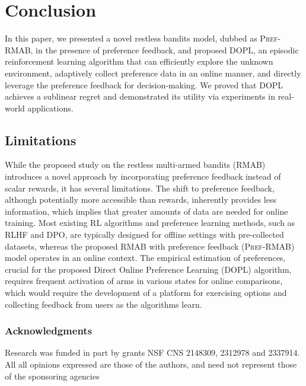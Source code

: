 \documentclass{article} %
\newcommand{\RMABPF}{\textsc{Pref-RMAB}\xspace}
\newcommand{\DOPL}{\textsc{DOPL}\xspace}
\begin{document}
\section{Conclusion}
In this paper, we presented a novel restless bandits model, dubbed as \RMABPF, in the presence of preference feedback, and proposed \DOPL, an episodic reinforcement learning algorithm that can efficiently explore the unknown environment, adaptively collect preference data in an online manner, and directly leverage the preference feedback for decision-making. We proved that \DOPL achieves a sublinear regret and demonstrated its utility via experiments in real-world applications. 



\subsection*{Limitations}
While the proposed study on the restless multi-armed bandits (RMAB) introduces a novel approach by incorporating preference feedback instead of scalar rewards, it has several limitations. The shift to preference feedback, although potentially more accessible than rewards, inherently provides less information, which implies that greater amounts of data are needed for online training.  Most existing RL algorithms and preference learning methods, such as RLHF and DPO, are typically designed for offline settings with pre-collected datasets, whereas the proposed RMAB with preference feedback (\RMABPF) model operates in an online context.   The empirical estimation of preferences, crucial for the proposed Direct Online Preference Learning (DOPL) algorithm, requires frequent activation of arms in various states for online comparisons, which would require the development of a platform for exercising  options and collecting feedback from users as the algorithms learn. 


\subsubsection*{Acknowledgments}
Research was funded in part by grants NSF CNS 2148309, 2312978 and 2337914. All all opinions expressed are those of the authors, and need not represent those of the sponsoring agencies







\appendix
\end{document}

